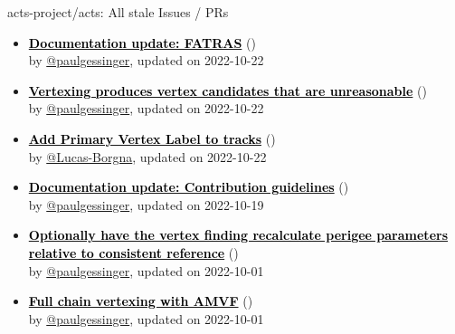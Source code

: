 \begin{frame}[allowframebreaks]{ acts-project/acts: All stale Issues / PRs}
\begin{itemize}
    \item\iss\prstale\textbf{\href{https://github.com/acts-project/acts/issues/1419}{\textcolor{black}{Documentation update: FATRAS}}}
    (\href{https://github.com/acts-project/acts/issues/1419}{}) \\
    by \href{https://github.com/paulgessinger}{@paulgessinger}, updated on 2022-10-22

    \item\iss\prstale\textbf{\href{https://github.com/acts-project/acts/issues/1361}{\textcolor{black}{Vertexing produces vertex candidates that are unreasonable}}}
    (\href{https://github.com/acts-project/acts/issues/1361}{}) \\
    by \href{https://github.com/paulgessinger}{@paulgessinger}, updated on 2022-10-22

    \item\iss\prstale\textbf{\href{https://github.com/acts-project/acts/issues/1544}{\textcolor{black}{Add Primary Vertex Label to tracks}}}
    (\href{https://github.com/acts-project/acts/issues/1544}{}) \\
    by \href{https://github.com/Lucas-Borgna}{@Lucas-Borgna}, updated on 2022-10-22

    \item\iss\prstale\textbf{\href{https://github.com/acts-project/acts/issues/1423}{\textcolor{black}{Documentation update: Contribution guidelines}}}
    (\href{https://github.com/acts-project/acts/issues/1423}{}) \\
    by \href{https://github.com/paulgessinger}{@paulgessinger}, updated on 2022-10-19

    \item\iss\prstale\textbf{\href{https://github.com/acts-project/acts/issues/1482}{\textcolor{black}{Optionally have the vertex finding recalculate perigee parameters relative to consistent reference}}}
    (\href{https://github.com/acts-project/acts/issues/1482}{}) \\
    by \href{https://github.com/paulgessinger}{@paulgessinger}, updated on 2022-10-01

    \item\iss\prstale\textbf{\href{https://github.com/acts-project/acts/issues/1406}{\textcolor{black}{Full chain vertexing with AMVF}}}
    (\href{https://github.com/acts-project/acts/issues/1406}{}) \\
    by \href{https://github.com/paulgessinger}{@paulgessinger}, updated on 2022-10-01


\end{itemize}
\end{frame}
